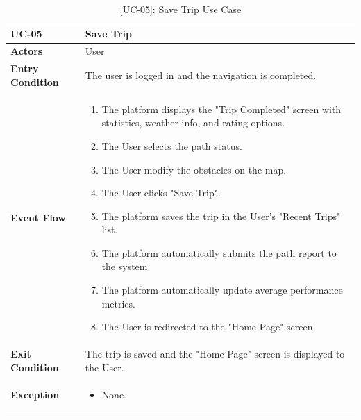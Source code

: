 \newpage
\begin{table}[H]
    \centering
    \setlength\extrarowheight{2pt}
    \renewcommand{\arraystretch}{1.2}
    \begin{tabularx}{\textwidth}{|>{\bfseries}l|X|}
    \hline
    UC-05 & Save Trip \\ \hline
    Actors & User\\ \hline
    Entry Condition & The user is logged in and the navigation is completed.\\ \hline
    Event Flow & 
    \begin{enumerate}
      \item The platform displays the "Trip Completed" screen with statistics, weather info, and rating options. 
      \item The User selects the path status.
      \item The User modify the obstacles on the map.
      \item The User clicks "Save Trip".
      \item The platform saves the trip in the User's "Recent Trips" list.
      \item The platform automatically submits the path report to the system.
      \item The platform automatically update average performance metrics.
      \item The User is redirected to the "Home Page" screen.
    \end{enumerate}
    \\ \hline
    Exit Condition & The trip is saved and the "Home Page" screen is displayed to the User.\\ \hline
    Exception & 
    \begin{itemize}
        \item None.
    \end{itemize}
    \\ \hline
   \end{tabularx}
   \caption{[UC-05]: Save Trip Use Case }
    \label{UC-05}
\end{table}

